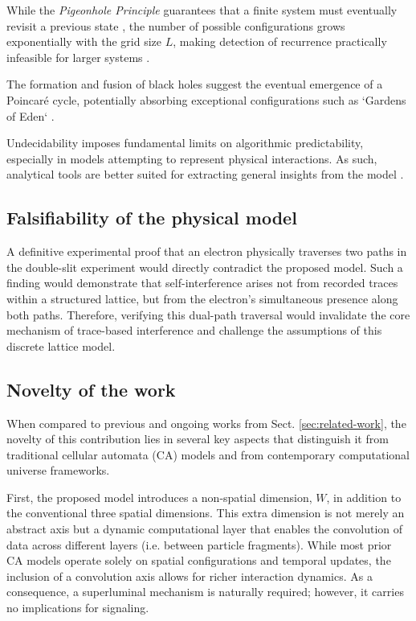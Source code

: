 \documentclass[12pt,english]{article}
\begin{document}
While the \textit{Pigeonhole Principle} guarantees that a finite system must eventually revisit a previous state \cite{bernstein2007}, the number of possible configurations grows exponentially with the grid size \( L \), making detection of recurrence practically infeasible for larger systems \cite{toffoli1980}.

The formation and fusion of black holes suggest the eventual emergence of a Poincaré cycle, potentially absorbing exceptional configurations such as `Gardens of Eden` \cite{moore1962}.

Undecidability imposes fundamental limits on algorithmic predictability, especially in models attempting to represent physical interactions. As such, analytical tools are better suited for extracting general insights from the model \cite{wolfram}.

\subsection{Falsifiability of the physical model}

A definitive experimental proof that an electron physically traverses two paths in the double-slit experiment would directly contradict the proposed model. Such a finding would demonstrate that self-interference arises not from recorded traces within a structured lattice, but from the electron's simultaneous presence along both paths. Therefore, verifying this dual-path traversal would invalidate the core mechanism of trace-based interference and challenge the assumptions of this discrete lattice model. 

\subsection{Novelty of the work}

When compared to previous and ongoing works from Sect. \ref{sec:related-work}, the novelty of this contribution lies in several key aspects that distinguish it from traditional cellular automata (CA) models and from contemporary computational universe frameworks.

First, the proposed model introduces a non-spatial dimension, $W$, in addition to the conventional three spatial dimensions. This extra dimension is not merely an abstract axis but a dynamic computational layer that enables the convolution of data across different layers (i.e. between particle fragments). While most prior CA models operate solely on spatial configurations and temporal updates, the inclusion of a convolution axis allows for richer interaction dynamics. As a consequence, a superluminal mechanism is naturally required; however, it carries no implications for signaling.
\end{document}
